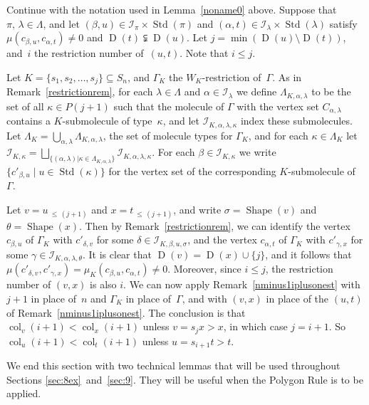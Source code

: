 \documentclass[ALCO,ThmDefs,Unicode,epreuves]{cedram}
\DeclareMathOperator{\col}{col}
\newcommand{\Lessthan}[2]{#1\,{_{\leqslant\,#2}}}
\DeclareMathOperator{\STD}{Std}
\DeclareMathOperator{\shape}{Shape}
\DeclareMathOperator{\D}{D}
\begin{document}
\begin{rema}\label{iplusonest}
Continue with the notation used in Lemma~\ref{noname0} above.
Suppose that $\pi,\,\lambda\in\Lambda$, and
let $(\beta,u)\in\mathcal{I}_{\pi}\times\STD(\pi)$ and
$(\alpha,t)\in\mathcal{I}_{\lambda}\times\STD(\lambda)$ satisfy
$\mu(c_{\beta,u},c_{\alpha,t}) \neq 0$ and $\D(t) \subsetneqq \D(u)$.
Let $j=\min(\D(u)\setminus\D(t))$, and~$i$ the restriction number of~$(u,t)$.
Note that $i\leqslant j$.

Let $K=\{s_1,s_2,\ldots,s_j\}\subseteq S_n$, and
$\Gamma_K$ the $W_K$-restriction of~$\Gamma$.
As in Remark~\ref{restrictionrem}, for each $\lambda\in\Lambda$
and $\alpha\in\mathcal{I}_\lambda$ we define $\Lambda_{K,\alpha,\lambda}$ to be the
set of all $\kappa\in P(j+1)$ such that the molecule of $\Gamma$ with the vertex set
$C_{\alpha,\lambda}$ contains a $K$-submolecule of type~$\kappa$,
and let $\mathcal{I}_{K,\alpha,\lambda,\kappa}$ index these
submolecules. Let $\Lambda_K=\bigcup_{\alpha,\lambda}\Lambda_{K,\alpha,\lambda}$, the
set of molecule types for $\Gamma_K$, and for each $\kappa\in\Lambda_K$ let
$\mathcal{I}_{K,\kappa}=\bigsqcup_{\{(\alpha,\lambda)|\kappa\in\Lambda_{K,\alpha,\lambda}\}}
\mathcal{I}_{K,\alpha,\lambda,\kappa}$. For each $\beta\in\mathcal{I}_{K,\kappa}$ we
write $\{c'_{\beta,u}\mid u\in\STD(\kappa)\}$ for the vertex set of the corresponding
$K$-submolecule of~$\Gamma$.

Let $v=\Lessthan u{(j+1)}$ and $x=\Lessthan t{(j+1)}$, and write $\sigma=\shape(v)$
and $\theta=\shape(x)$. Then by Remark~\ref{restrictionrem}, we can identify the vertex
$c_{\beta,u}$ of $\Gamma_K$ with $c'_{\delta,v}$ for some
$\delta\in\mathcal{I}_{K,\beta,u,\sigma}$, and
the vertex $c_{\alpha,t}$ of $\Gamma_K$ with $c'_{\gamma,x}$ for some
$\gamma\in\mathcal{I}_{K,\alpha,\lambda,\theta}$. It is clear that $\D(v)=\D(x)\cup\{j\}$,
and it follows that $\mu(c'_{\delta,v},c'_{\gamma,x})=\mu_K(c_{\beta,u},c_{\alpha,t})\neq 0$.
Moreover, since $i\leqslant j$, the restriction number of $(v,x)$ is also $i$. We can
now apply Remark~\ref{nminus1iplusonest} with $j+1$ in place of~$n$ and $\Gamma_K$ in
place of~$\Gamma$, and with $(v,x)$ in place of the $(u,t)$ of
Remark~\ref{nminus1iplusonest}. The conclusion is that $\col_v(i+1)<\col_x(i+1)$
unless $v=s_jx>x$, in which case $j=i+1$. So $\col_u(i+1)<\col_t(i+1)$ unless $u=s_{i+1}t>t$.
\end{rema}
We end this section with two technical lemmas that will be used throughout
Sections \ref{sec:8ex}~and~\ref{sec:9}. They will be useful when the Polygon Rule
is to be applied.
\end{document}
